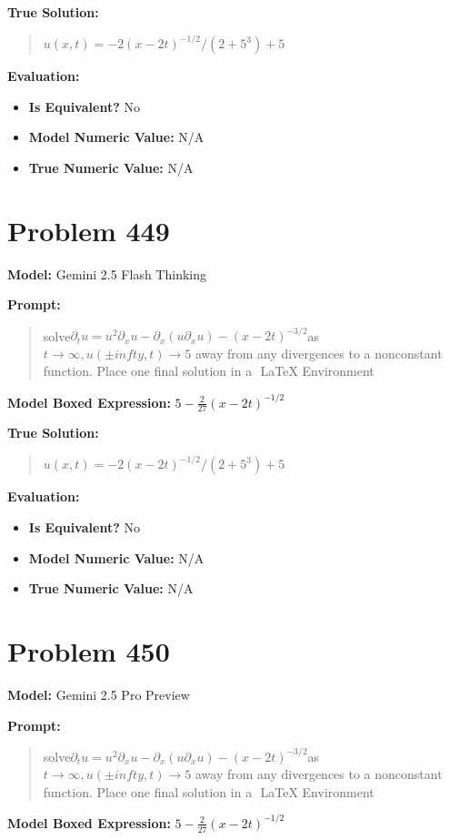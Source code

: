 \documentclass{article}
\begin{document}
\textbf{True Solution:}
\begin{quote}
$u(x,t)=-2(x-2t)^{-1/2}/(2+5^3)+5$
\end{quote}

\textbf{Evaluation:}
\begin{itemize}
\item \textbf{Is Equivalent?} No
\item \textbf{Model Numeric Value:} N/A
\item \textbf{True Numeric Value:} N/A
\end{itemize}
\vspace{1cm}
\section*{Problem 449}
\textbf{Model:} Gemini 2.5 Flash Thinking

\textbf{Prompt:}
\begin{quote}
solve$ \partial_t u = u^2 \partial_x u - \partial_x \left( u \partial_x u \right) - (x-2t)^{-3/2} $as $t\to\infty, u(\pm infty,t)\to 5$ away from any divergences to a nonconstant function. Place one final solution in a $\boxed{}$ LaTeX Environment
\end{quote}
\textbf{Model Boxed Expression:} $5 - \frac{2}{27}(x-2t)^{-1/2}$

\textbf{True Solution:}
\begin{quote}
$u(x,t)=-2(x-2t)^{-1/2}/(2+5^3)+5$
\end{quote}

\textbf{Evaluation:}
\begin{itemize}
\item \textbf{Is Equivalent?} No
\item \textbf{Model Numeric Value:} N/A
\item \textbf{True Numeric Value:} N/A
\end{itemize}
\vspace{1cm}
\section*{Problem 450}
\textbf{Model:} Gemini 2.5 Pro Preview

\textbf{Prompt:}
\begin{quote}
solve$ \partial_t u = u^2 \partial_x u - \partial_x \left( u \partial_x u \right) - (x-2t)^{-3/2} $as $t\to\infty, u(\pm infty,t)\to 5$ away from any divergences to a nonconstant function. Place one final solution in a $\boxed{}$ LaTeX Environment
\end{quote}
\textbf{Model Boxed Expression:} $5 - \frac{2}{27}(x-2t)^{-1/2}$
\end{document}
